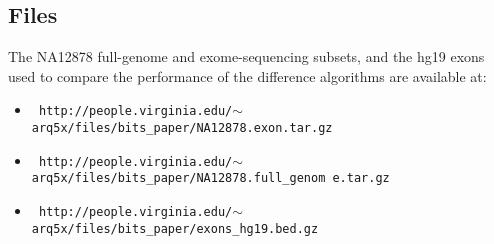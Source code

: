 \subsection{Files}

The NA12878 full-genome and exome-sequencing subsets, and the hg19 exons used to
compare the performance of the difference algorithms are available at:

\begin{itemize}
	\item {\tt 
	http://people.virginia.edu/$\sim$arq5x/files/bits\_paper/NA12878.exon.tar.gz}
	\item {\tt 
	http://people.virginia.edu/$\sim$arq5x/files/bits\_paper/NA12878.full\_genom
	e.tar.gz}
	\item {\tt 
	http://people.virginia.edu/$\sim$arq5x/files/bits\_paper/exons\_hg19.bed.gz}
\end{itemize}
